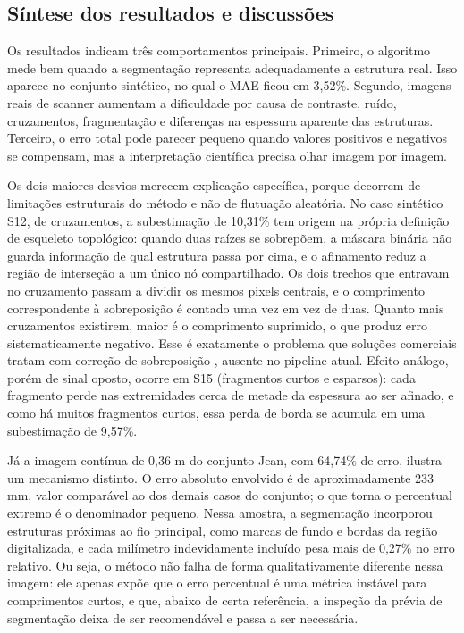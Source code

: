\documentclass[12pt]{article}
\begin{document}
\subsection{Síntese dos resultados e discussões}
\label{sec:sintese}

Os resultados indicam três comportamentos principais. Primeiro, o algoritmo mede bem quando a segmentação representa adequadamente a estrutura real. Isso aparece no conjunto sintético, no qual o MAE ficou em 3,52\%. Segundo, imagens reais de scanner aumentam a dificuldade por causa de contraste, ruído, cruzamentos, fragmentação e diferenças na espessura aparente das estruturas. Terceiro, o erro total pode parecer pequeno quando valores positivos e negativos se compensam, mas a interpretação científica precisa olhar imagem por imagem.

Os dois maiores desvios merecem explicação específica, porque decorrem de limitações estruturais do método e não de flutuação aleatória. No caso sintético S12, de cruzamentos, a subestimação de 10,31\% tem origem na própria definição de esqueleto topológico: quando duas raízes se sobrepõem, a máscara binária não guarda informação de qual estrutura passa por cima, e o afinamento reduz a região de interseção a um único nó compartilhado. Os dois trechos que entravam no cruzamento passam a dividir os mesmos pixels centrais, e o comprimento correspondente à sobreposição é contado uma vez em vez de duas. Quanto mais cruzamentos existirem, maior é o comprimento suprimido, o que produz erro sistematicamente negativo. Esse é exatamente o problema que soluções comerciais tratam com correção de sobreposição \cite{arsenault1995winrhizo}, ausente no pipeline atual. Efeito análogo, porém de sinal oposto, ocorre em S15 (fragmentos curtos e esparsos): cada fragmento perde nas extremidades cerca de metade da espessura ao ser afinado, e como há muitos fragmentos curtos, essa perda de borda se acumula em uma subestimação de 9,57\%.

Já a imagem contínua de 0,36 m do conjunto Jean, com 64,74\% de erro, ilustra um mecanismo distinto. O erro absoluto envolvido é de aproximadamente 233 mm, valor comparável ao dos demais casos do conjunto; o que torna o percentual extremo é o denominador pequeno. Nessa amostra, a segmentação incorporou estruturas próximas ao fio principal, como marcas de fundo e bordas da região digitalizada, e cada milímetro indevidamente incluído pesa mais de 0,27\% no erro relativo. Ou seja, o método não falha de forma qualitativamente diferente nessa imagem: ele apenas expõe que o erro percentual é uma métrica instável para comprimentos curtos, e que, abaixo de certa referência, a inspeção da prévia de segmentação deixa de ser recomendável e passa a ser necessária.
\end{document}
